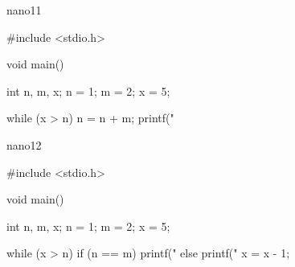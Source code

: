 \documentclass[12pt,a4paper,twoside]{article}
\begin{document}
nano11
\begin{terminal}
    #include <stdio.h>

    void main() {
      int n, m, x;
      n = 1;
      m = 2;
      x = 5;
    
      while (x > n) {
        n = n + m;
        printf("%
      }
    }
\end{terminal}
nano12
\begin{terminal}
    #include <stdio.h>
    
    void main() {
      int n, m, x;
      n = 1;
      m = 2;
      x = 5;
    
      while (x > n) {
        if (n == m)
          printf("%
        else
          printf("%
        x = x - 1;
      }
    }
\end{terminal}
\end{document}
